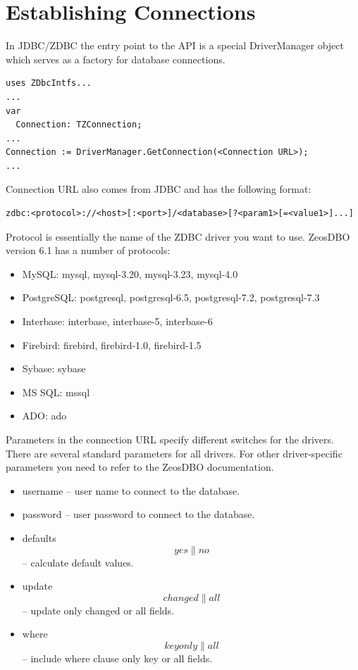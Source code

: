 \documentclass[a4paper,12pt,oneside]{book}
\begin{document}
\section{Establishing Connections}
In JDBC/ZDBC the entry point to the API is a special DriverManager object which serves as a factory for database connections. 

\begin{verbatim}
uses ZDbcIntfs...
...
var
  Connection: TZConnection;
...
Connection := DriverManager.GetConnection(<Connection URL>);
...
\end{verbatim}

Connection URL also comes from JDBC and has the following format:
\begin{verbatim}
zdbc:<protocol>://<host>[:<port>]/<database>[?<param1>[=<value1>]...]
\end{verbatim}

Protocol is essentially the name of the ZDBC driver you want to use. ZeosDBO version 6.1 has a number of protocols:
\begin{itemize}
  \item MySQL: mysql, mysql-3.20, mysql-3.23, mysql-4.0
	\item PostgreSQL: postgresql, postgresql-6.5, postgresql-7.2, postgresql-7.3
	\item Interbase: interbase, interbase-5, interbase-6
	\item Firebird: firebird, firebird-1.0, firebird-1.5
	\item Sybase: sybase
	\item MS SQL: mssql
	\item ADO: ado
\end{itemize}

Parameters in the connection URL specify different switches for the drivers.
There are several standard parameters for all drivers.
For other driver-specific parameters you need to refer to the ZeosDBO documentation. 
\begin{itemize}
  \item username – user name to connect to the database.
  \item password – user password to connect to the database.
  \item defaults \[yes \| no\] – calculate default values.
  \item update \[changed \| all\] – update only changed or all fields.
  \item where \[keyonly \| all\] – include where clause only key or all fields.
\end{itemize}
\end{document}
